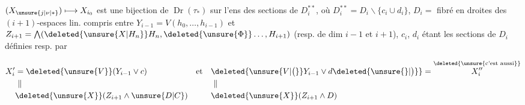  $(X_{\unsure{j|\nu|*}})\longmapsto X_{i_0}$ est une bijection de $\operatorname{Dr}(\tau_*)$ sur l'ens des sections de $D_i^{**}$, où $D_i^{**}=D_i\smallsetminus\{c_i\cup d_i\}$, $D_i=$ fibré en droites des $(i+1)$-espaces lin. compris entre $Y_{i-1}=V(h_0,\ldots,h_{i-1})$ et $Z_{i+1}=\bigwedge(\deleted{\unsure{X|H_n}}H_n,\deleted{\unsure{\Phi}}\ldots,H_{i+1})$ (resp. de dim $i-1$ et $i+1$), $c_i$, $d_i$ étant les sections de $D_i$ définies resp. par


\[
\begin{aligned}
X'_i&=\deleted{\unsure{V}}(Y_{i-1}\vee c) &\text{et}\quad &\deleted{\unsure{V|\bigl(}}Y_{i-1}\vee d\deleted{\unsure{\}|\bigr)}}=\overset{\deleted{\unsure{\text{c'est aussi}}}}{X''_i}\\
&\ \Vert &&\ \Vert\\
&\deleted{\unsure{X}}(Z_{i+1}\wedge \unsure{D|C}) && \deleted{\unsure{X}}(Z_{i+1}\wedge D)
\end{aligned}
\]


